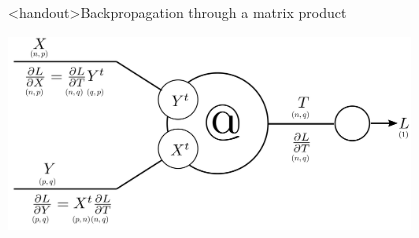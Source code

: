 \documentclass[xcolor=pdftex,dvipsnames,table,mathserif]{beamer}
\begin{document}
\begin{frame}<handout>{Backpropagation through a matrix product}

  \centering
  \includegraphics[width=0.8\textwidth]{matrix_mult_4.png}

\end{frame}







\end{document}
